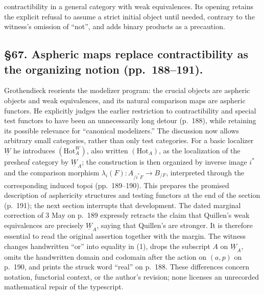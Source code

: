 \documentclass[10pt,oneside]{book}
\begin{document}
contractibility in a general category with weak equivalences. Its opening retains the explicit refusal to assume a strict initial object until needed, contrary to the witness's omission of ``not'', and adds binary products as a precaution.

\subsection*{\S67. Aspheric maps replace contractibility as the organizing notion (pp.\ 188--191).}
Grothendieck reorients the modelizer program: the crucial objects are aspheric objects and weak equivalences, and its natural comparison maps are aspheric functors. He explicitly judges the earlier restriction to contractibility and special test functors to have been an unnecessarily long detour (p.\ 188), while retaining its possible relevance for ``canonical modelizers.'' The discussion now allows arbitrary small categories, rather than only test categories. For a basic localizer $\underline W$ he introduces $(\mathrm{Hot}^{W}_{A})$, also written $(\mathrm{Hot}_{A})$, as the localization of the presheaf category by $\underline W_A$; the construction is then organized by inverse image $i^*$ and the comparison morphism $\lambda_i(F):A_{/i^*F}\longrightarrow B_{/F}$, interpreted through the corresponding induced topoi (pp.\ 189--190). This prepares the promised description of asphericity structures and testing functors at the end of the section (p.\ 191); the next section interrupts that development. The dated marginal correction of 3 May on p.\ 189 expressly retracts the claim that Quillen's weak equivalences are precisely $\underline W_A$, saying that Quillen's are stronger. It is therefore essential to read the original assertion together with the margin. The witness changes handwritten ``or'' into equality in (1), drops the subscript $A$ on $\underline W_A$, omits the handwritten domain and codomain after the action on $(a,p)$ on p.\ 190, and prints the struck word ``real'' on p.\ 188. These differences concern notation, functorial context, or the author's revision; none licenses an unrecorded mathematical repair of the typescript.
\end{document}
